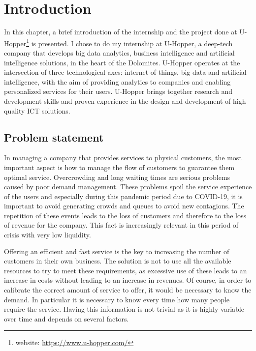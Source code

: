 \chapter{Introduction}
\label{cha:intro}
\vspace{0.4 cm} 

In this chapter, a brief introduction of the internship and the project done at U-Hopper\footnote{ website: \url{https://www.u-hopper.com/} } is presented.
I chose to do my internship at U-Hopper, a deep-tech company that develops big data analytics, business intelligence and artificial intelligence solutions, in the heart of the Dolomites.
U-Hopper operates at the intersection of three technological axes: internet of things, big data and artificial intelligence, with the aim of providing analytics to companies and enabling personalized services for their users.
U-Hopper brings together research and development skills and proven experience in the design and development of high quality ICT solutions.


\section{Problem statement}
\label{sec:problem}
\vspace{0.2 cm} 

In managing a company that provides services to physical customers, the most important aspect is how to manage the flow of customers to guarantee them optimal service. Overcrowding and long waiting times are serious problems caused by poor demand management. These problems spoil the service experience of the users and especially during this pandemic period due to COVID-19, it is important to avoid generating crowds and queues to avoid new contagions. The repetition of these events leads to the loss of customers and therefore to the loss of revenue for the company. This fact is increasingly relevant in this period of crisis with very low liquidity.

Offering an efficient and fast service is the key to increasing the number of customers in their own business. The solution is not to use all the available resources to try to meet these requirements, as excessive use of these leads to an increase in costs without leading to an increase in revenues.
Of course, in order to calibrate the correct amount of service to offer, it would be necessary to know the demand. In particular it is necessary to know every time how many people require the service. Having this information is not trivial as it is highly variable over time and depends on several factors.

